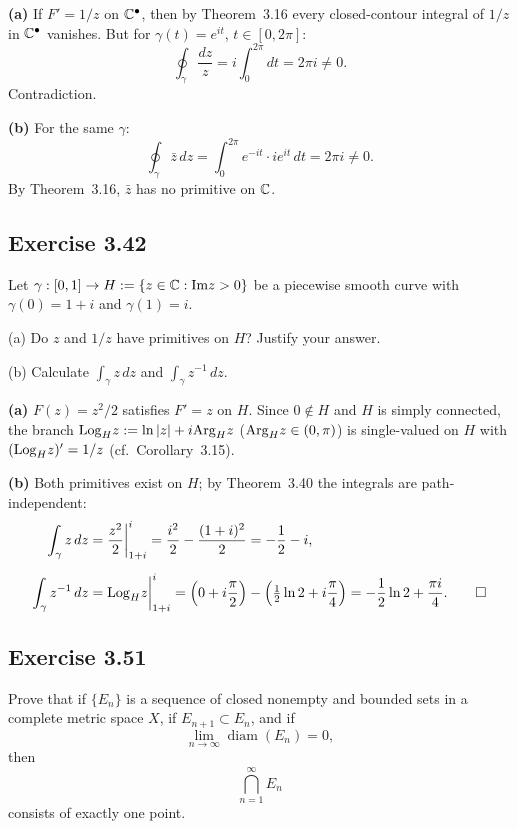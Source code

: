 \documentclass{article}
\begin{document}
\begin{solution}
	\textbf{(a)}\;
	If $F'=1/z$ on $\mathbb{C}^\bullet$, then by Theorem~3.16
	every closed-contour integral of $1/z$ in $\mathbb{C}^\bullet$ vanishes.
	But for $\gamma(t)=e^{it}$, $t\in[0,2\pi]$:
	\[
		\oint_\gamma\frac{dz}{z}
		=i\int_0^{2\pi}dt=2\pi i\neq0.
	\]
	Contradiction.

	\medskip

	\textbf{(b)}\;
	For the same $\gamma$:
	\[
		\oint_\gamma\bar z\,dz
		=\int_0^{2\pi}e^{-it}\cdot ie^{it}\,dt=2\pi i\neq0.
	\]
	By Theorem~3.16, $\bar z$ has no primitive on $\mathbb{C}$.\qedhere
\end{solution}

\subsection{Exercise 3.42}

Let $\gamma : [0,1] \to H := \{z \in \mathbb{C} : \mathrm{Im} z > 0\}$ be a
piecewise smooth curve with $\gamma(0)=1+i$ and $\gamma(1)=i$.

(a) Do $z$ and $1/z$ have primitives on $H$? Justify your answer.

(b) Calculate $\int_\gamma z\,dz$ and $\int_\gamma z^{-1}\,dz$.

\begin{solution}
	\textbf{(a)}\;
	$F(z)=z^2/2$ satisfies $F'=z$ on $H$.
	Since $0\notin H$ and $H$ is simply connected, the branch
	$\mathrm{Log}_H z:=\ln|z|+i\mathrm{Arg}_H z$ ($\mathrm{Arg}_H z\in(0,\pi)$)
	is single-valued on $H$ with $(\mathrm{Log}_H z)'=1/z$
	(cf.\ Corollary~3.15).

	\medskip

	\textbf{(b)}\;
	Both primitives exist on $H$; by Theorem~3.40 the integrals
	are path-independent:
	\begin{align*}
		\int_\gamma z\,dz
		&=\frac{z^2}{2}\bigg|_{1+i}^{i}
		=\frac{i^2}{2}-\frac{(1+i)^2}{2}
		=-\frac12-i,\\[6pt]
		\int_\gamma z^{-1}\,dz
		&=\mathrm{Log}_H z\bigg|_{1+i}^{i}
		=\Bigl(0+i\frac\pi2\Bigr)
		-\Bigl(\tfrac12\ln2+i\frac\pi4\Bigr)
		=-\frac12\ln2+\frac{\pi i}{4}.\qedhere
	\end{align*}
\end{solution}

\subsection{Exercise 3.51}

Prove that if $\{E_n\}$ is a sequence of closed nonempty and
bounded sets in a complete metric space $X$, if
$E_{n+1} \subset E_n$, and if
\[
	\lim_{n\to\infty} \operatorname{diam}(E_n)=0,
\]
then
\[
	\bigcap_{n=1}^{\infty} E_n
\]
consists of exactly one point.
\end{document}
